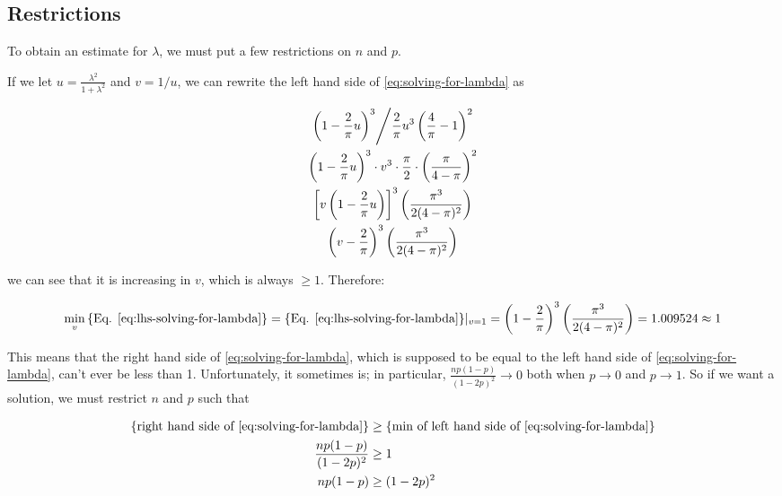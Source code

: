 \subsection{Restrictions}

To obtain an estimate for $\lambda$, we must put a few restrictions on $n$ and
$p$.

If we let $u = \frac{\lambda^2}{1+\lambda^2}$ and $v = 1/u$, we can rewrite the
left hand side of \eqref{eq:solving-for-lambda} as

\begin{gather}
  \left. \left( 1 - \frac{2}{\pi} u \right)^3 \middle/ \frac{2}{\pi} u^3 \left( \frac{4}{\pi} - 1 \right)^2 \right. \nonumber \\
  \left( 1 - \frac{2}{\pi} u \right)^3 \cdot v^3 \cdot \frac{\pi}{2} \cdot \left( \frac{\pi}{4-\pi} \right)^2 \nonumber \\
  \left[ v \left( 1 - \frac{2}{\pi} u \right) \right]^3 \left( \frac{\pi^3}{2(4-\pi)^2} \right) \nonumber \\
  \left( v - \frac{2}{\pi} \right)^3 \left( \frac{\pi^3}{2(4-\pi)^2} \right) \label{eq:lhs-solving-for-lambda}
\end{gather}

we can see that it is increasing in $v$, which is always $\geq 1$. Therefore:

\begin{equation}
  \min_{v} \textnormal{\{Eq. \ref{eq:lhs-solving-for-lambda}\}} = \textnormal{\{Eq. \ref{eq:lhs-solving-for-lambda}\}} |_{v=1} = 
  \left( 1 - \frac{2}{\pi} \right)^3 \left( \frac{\pi^3}{2(4-\pi)^2} \right) = 1.009524 \approx 1
\end{equation}

This means that the right hand side of \eqref{eq:solving-for-lambda}, which is
supposed to be equal to the left hand side of \eqref{eq:solving-for-lambda},
can't ever be less than 1. Unfortunately, it sometimes is; in particular,
$\frac{np(1-p)}{(1-2p)^2} \to 0$ both when $p \to 0$ and $p \to 1$. So if we
want a solution, we must restrict $n$ and $p$ such that

\begin{align}
  \textnormal{\{right hand side of \eqref{eq:solving-for-lambda}\}} &\geq \textnormal{\{min of left hand side of \eqref{eq:solving-for-lambda}\}} \nonumber \\
  \frac{np(1-p)}{(1-2p)^2} &\geq 1 \nonumber \\
  np(1-p) &\geq (1-2p)^2 \label{eq:solving-the-restriction}
\end{align}

